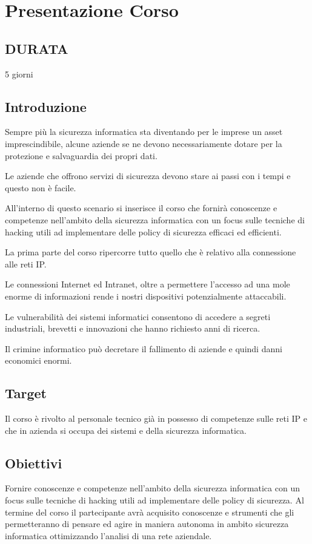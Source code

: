 \chapter{Presentazione Corso}


\section{DURATA}
 5 giorni
\section{Introduzione}

Sempre più la sicurezza informatica sta diventando per le imprese un asset imprescindibile, alcune aziende se ne devono necessariamente
dotare per la protezione e salvaguardia dei propri dati.

Le aziende che offrono servizi di sicurezza devono stare ai passi con i tempi e questo non è facile.

All’interno di questo scenario si inserisce il corso che fornirà conoscenze e competenze nell’ambito
della sicurezza informatica con un focus sulle tecniche di hacking utili ad implementare delle policy
di sicurezza efficaci ed efficienti.

La prima parte del corso ripercorre tutto quello che è relativo alla connessione alle reti IP.

Le connessioni Internet ed Intranet, oltre a permettere l'accesso ad una mole enorme di informazioni
rende i nostri dispositivi potenzialmente attaccabili.

Le vulnerabilità dei sistemi informatici consentono di accedere a segreti industriali, brevetti e
innovazioni che hanno richiesto anni di ricerca.

Il crimine informatico può decretare il fallimento di aziende e quindi danni economici enormi.

\section{Target}
Il corso è rivolto al personale tecnico già in possesso di competenze sulle reti IP e che in azienda si
occupa dei sistemi e della sicurezza informatica.

\section{Obiettivi}
Fornire conoscenze e competenze nell’ambito della sicurezza informatica con un focus sulle
tecniche di hacking utili ad implementare delle policy di sicurezza.
Al termine del corso il partecipante avrà acquisito conoscenze e strumenti che gli permetteranno di
pensare ed agire in maniera autonoma in ambito sicurezza informatica ottimizzando l'analisi di una rete aziendale.

